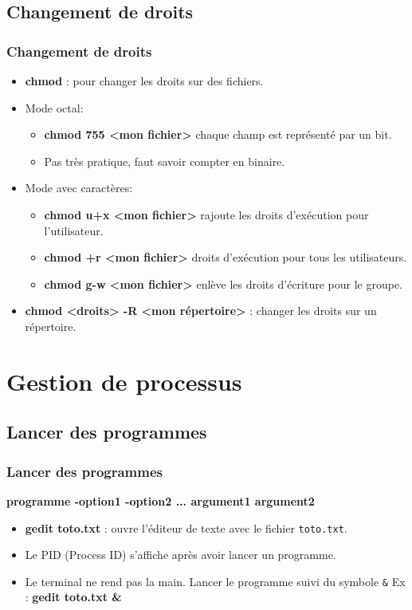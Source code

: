 \documentclass{beamer}
\begin{document}
    \subsection{Changement de droits}
    \begin{frame}
        \frametitle{Changement de droits}
        \begin{itemize}
            \item {\bf chmod} : pour changer les droits sur des fichiers.
            \item Mode octal:
                \begin{itemize}
                    \item {\bf chmod 755 <mon fichier>} chaque champ est représenté par un bit.
                    \item Pas très pratique, faut savoir compter en binaire.
                \end{itemize}
            \item Mode avec caractères:
                \begin{itemize}
                    \item {\bf chmod u+x <mon fichier>} rajoute les droits d'exécution pour l'utilisateur.
                    \item {\bf chmod +r <mon fichier>} droits d'exécution pour tous les utilisateurs.
                    \item {\bf chmod g-w <mon fichier>} enlève les droits d'écriture pour le groupe.
                \end{itemize}
            \item {\bf chmod <droits> -R <mon répertoire>} : changer les droits sur un répertoire.
        \end{itemize}
    \end{frame}
    
    \section{Gestion de processus}
    \subsection{Lancer des programmes}
    \begin{frame}
        \frametitle{Lancer des programmes}
        {\bf programme -option1 -option2 ... argument1 argument2}
        \begin{itemize}
            \item {\bf gedit toto.txt} : ouvre l'éditeur de texte avec le fichier \texttt{toto.txt}.
            \item Le PID (Process ID) s'affiche après avoir lancer un programme.
            \item Le terminal ne rend pas la main.\newline
                Lancer le programme suivi du symbole \texttt{\&}\newline
                Ex : {\bf gedit toto.txt \&}
        \end{itemize}
    \end{frame}
\end{document}
